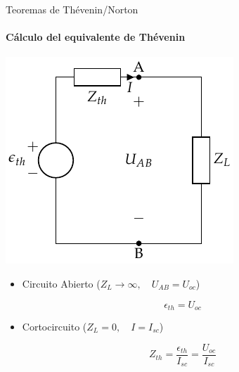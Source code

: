 \documentclass[aspectratio=169, usenames,svgnames,dvipsnames]{beamer}
\begin{document}
\begin{frame}[label={sec:org0210eea}]{Teoremas de Thévenin/Norton}
\framesubtitle{Cálculo del equivalente de Thévenin}
\begin{center}
\includegraphics[height=0.38\textheight]{../figs/EquivalenteThevenin0.pdf}
\end{center}

\begin{itemize}
\item Circuito Abierto (\(Z_L \to \infty, \quad U_{AB} = U_{oc}\))
\end{itemize}
\[
\boxed{\epsilon_{th} = U_{oc}}
\]
\begin{itemize}
\item Cortocircuito (\(Z_L = 0, \quad I = I_{sc}\))
\end{itemize}
\[
\boxed{Z_{th} = \frac{\epsilon_{th}}{I_{sc}} = \frac{U_{oc}}{I_{sc}}}
\]
\end{frame}
\end{document}
